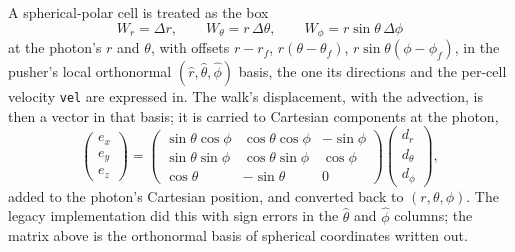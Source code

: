 \documentclass[11pt]{article}
\begin{document}
A spherical-polar cell is treated as the box
\begin{equation}
  W_r=\Delta r,\qquad W_\theta=r\,\Delta\theta,\qquad W_\phi=r\sin\theta\,\Delta\phi
\end{equation}
at the photon's $r$ and $\theta$, with offsets $r-r_f$, $r(\theta-\theta_f)$,
$r\sin\theta(\phi-\phi_f)$, in the pusher's local orthonormal $(\hat r,\hat\theta,\hat\phi)$
basis, the one its directions and the per-cell velocity \texttt{vel} are expressed in.
The walk's displacement, with the advection, is then a vector in that basis; it is
carried to Cartesian components at the photon,
\begin{equation}
  \begin{pmatrix}e_x\\e_y\\e_z\end{pmatrix}=
  \begin{pmatrix}\sin\theta\cos\phi&\cos\theta\cos\phi&-\sin\phi\\
                 \sin\theta\sin\phi&\cos\theta\sin\phi&\cos\phi\\
                 \cos\theta&-\sin\theta&0\end{pmatrix}
  \begin{pmatrix}d_r\\d_\theta\\d_\phi\end{pmatrix},
\end{equation}
added to the photon's Cartesian position, and converted back to $(r,\theta,\phi)$.  The
legacy implementation did this with sign errors in the $\hat\theta$ and $\hat\phi$
columns; the matrix above is the orthonormal basis of spherical coordinates written out.
\end{document}
